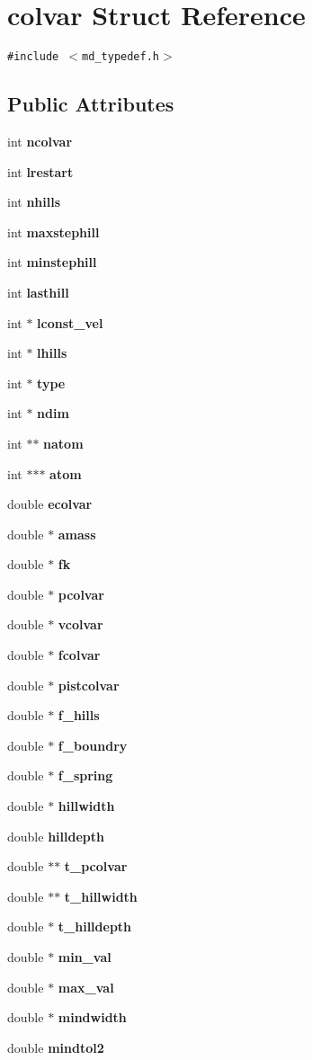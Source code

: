 \section{colvar Struct Reference}
\label{structcolvar}
{\tt \#include $<$md\_\-typedef.h$>$}

\subsection*{Public Attributes}
\begin{CompactItemize}
\item 
int {\bf ncolvar}
\item 
int {\bf lrestart}
\item 
int {\bf nhills}
\item 
int {\bf maxstephill}
\item 
int {\bf minstephill}
\item 
int {\bf lasthill}
\item 
int $\ast$ {\bf lconst\_\-vel}
\item 
int $\ast$ {\bf lhills}
\item 
int $\ast$ {\bf type}
\item 
int $\ast$ {\bf ndim}
\item 
int $\ast$$\ast$ {\bf natom}
\item 
int $\ast$$\ast$$\ast$ {\bf atom}
\item 
double {\bf ecolvar}
\item 
double $\ast$ {\bf amass}
\item 
double $\ast$ {\bf fk}
\item 
double $\ast$ {\bf pcolvar}
\item 
double $\ast$ {\bf vcolvar}
\item 
double $\ast$ {\bf fcolvar}
\item 
double $\ast$ {\bf pistcolvar}
\item 
double $\ast$ {\bf f\_\-hills}
\item 
double $\ast$ {\bf f\_\-boundry}
\item 
double $\ast$ {\bf f\_\-spring}
\item 
double $\ast$ {\bf hillwidth}
\item 
double {\bf hilldepth}
\item 
double $\ast$$\ast$ {\bf t\_\-pcolvar}
\item 
double $\ast$$\ast$ {\bf t\_\-hillwidth}
\item 
double $\ast$ {\bf t\_\-hilldepth}
\item 
double $\ast$ {\bf min\_\-val}
\item 
double $\ast$ {\bf max\_\-val}
\item 
double $\ast$ {\bf mindwidth}
\item 
double {\bf mindtol2}
\end{CompactItemize}


